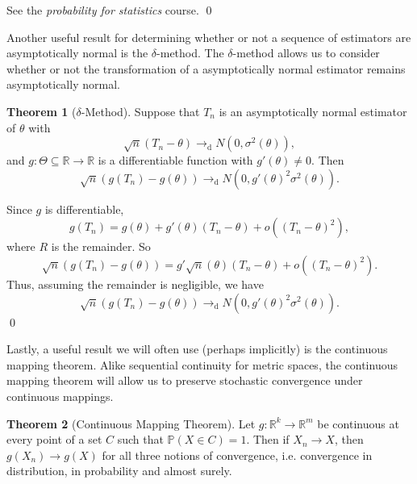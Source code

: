 \documentclass[
]{article}
\theoremstyle{definition}
\newtheorem{theorem}{Theorem}
\theoremstyle{definition}
\begin{document}
See the \emph{probability for statistics} course. \qed

Another useful result for determining whether or not a sequence of
estimators are asymptotically normal is the \(\delta\)-method. The
\(\delta\)-method allows us to consider whether or not the
transformation of a asymptotically normal estimator remains
asymptotically normal.

\begin{theorem}[\(\delta\)-Method]
  Suppose that \(T_n\) is an asymptotically normal estimator of \(\theta\) with 
  \[\sqrt{n}(T_n - \theta) \to_\text{d} N(0, \sigma^2(\theta)),\]
  and \(g : \Theta \subseteq \mathbb{R} \to \mathbb{R}\) is a differentiable 
  function with \(g'(\theta) \neq 0\). Then 
  \[\sqrt{n}(g(T_n) - g(\theta)) \to_\text{d} N(0, g'(\theta)^2 \sigma^2(\theta)).\]
\end{theorem}
\proof

Since \(g\) is differentiable,
\[g(T_n) = g(\theta) + g'(\theta)(T_n - \theta) + o((T_n - \theta)^2),\]
where \(R\) is the remainder. So
\[\sqrt{n}(g(T_n) - g(\theta)) = g'\sqrt{n}(\theta)(T_n - \theta) + o((T_n - \theta)^2).\]
Thus, assuming the remainder is negligible, we have
\[\sqrt{n}(g(T_n) - g(\theta)) \to_\text{d} N(0, g'(\theta)^2 \sigma^2(\theta)).\]
\qed

Lastly, a useful result we will often use (perhaps implicitly) is the
continuous mapping theorem. Alike sequential continuity for metric
spaces, the continuous mapping theorem will allow us to preserve
stochastic convergence under continuous mappings.

\begin{theorem}[Continuous Mapping Theorem]
  Let \(g : \mathbb{R}^k \to \mathbb{R}^m\) be continuous at every point of a set 
  \(C\) such that \(\mathbb{P}(X \in C) = 1\). Then if \(X_n \to X\), 
  then \(g(X_n) \to g(X)\) for all three notions of convergence, i.e. 
  convergence in distribution, in probability and almost surely.
\end{theorem}
\end{document}
